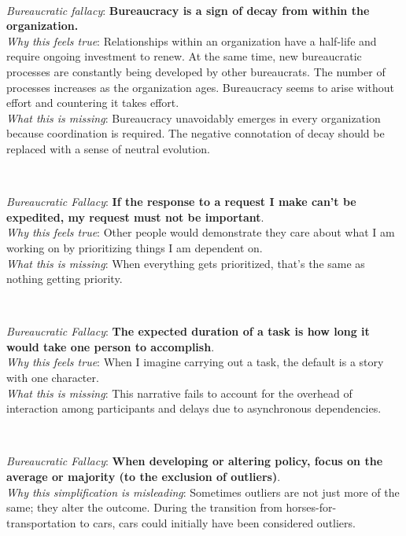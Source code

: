 \ \\
\begin{samepage}
\textit{Bureaucratic fallacy}: \textbf{Bureaucracy is a sign of decay from within the organization.} \\
\textit{Why this feels true}: Relationships within an organization have a half-life and require ongoing investment to renew. At the same time, new bureaucratic processes are constantly being developed by other bureaucrats. The number of processes increases as the organization ages. Bureaucracy seems to arise without effort and countering it takes effort.  \\
\textit{What this is missing}: Bureaucracy unavoidably emerges in every organization because coordination is required. The negative connotation of decay should be replaced with a sense of neutral evolution.
\end{samepage}

\ \\
\begin{samepage}
\textit{Bureaucratic Fallacy}: \textbf{If the response to a request I make can't be expedited, my request must not be important}.  \\
\textit{Why this feels true}: Other people would demonstrate they care about what I am working on by prioritizing things I am dependent on.\\
\textit{What this is missing}: When everything gets prioritized, that's the same as nothing getting priority.
\end{samepage}

\ \\
\begin{samepage}
\textit{Bureaucratic Fallacy}: \textbf{The expected duration of a task is how long it would take one person to accomplish}.  \\
\textit{Why this feels true}: When I imagine carrying out a task, the default is a story with one character. \\
\textit{What this is missing}: This narrative fails to account for the overhead of interaction among participants and delays due to asynchronous dependencies.~\cite{1975_brooks}
\end{samepage}

\ \\
\begin{samepage}
\textit{Bureaucratic Fallacy}: \textbf{When developing or altering policy, focus on the average or majority (to the exclusion of outliers)}. \\
\textit{Why this simplification is misleading}: Sometimes outliers are not just more of the same; they alter the outcome. During the transition from horses-for-transportation to cars, cars could initially have been considered outliers. 
\end{samepage}

